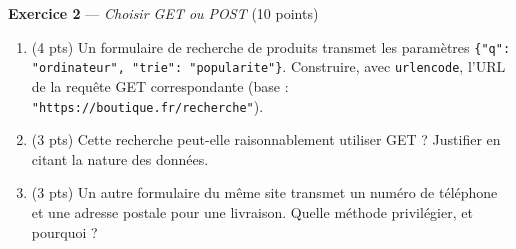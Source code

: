 \textbf{Exercice 2} --- \textit{Choisir GET ou POST} \hfill (10 points)

\begin{enumerate}
  \item (4 pts) Un formulaire de recherche de produits transmet les paramètres \lstinline|{"q": "ordinateur", "trie": "popularite"}|. Construire, avec \lstinline{urlencode}, l'URL de la requête GET correspondante (base : \lstinline{"https://boutique.fr/recherche"}).
  \item (3 pts) Cette recherche peut-elle raisonnablement utiliser GET ? Justifier en citant la nature des données.
  \item (3 pts) Un autre formulaire du même site transmet un numéro de téléphone et une adresse postale pour une livraison. Quelle méthode privilégier, et pourquoi ?
\end{enumerate}

